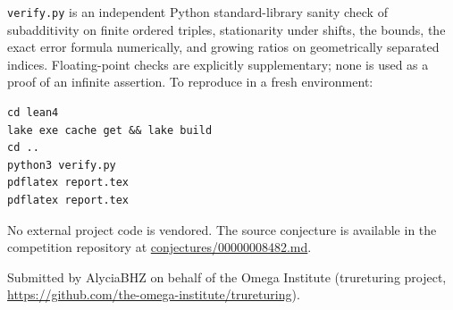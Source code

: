 \documentclass[11pt]{article}
\begin{document}
\texttt{verify.py} is an independent Python standard-library sanity check
of subadditivity on finite ordered triples, stationarity under shifts,
the bounds, the exact error formula numerically, and growing ratios on
geometrically separated indices. Floating-point checks are explicitly
supplementary; none is used as a proof of an infinite assertion. To
reproduce in a fresh environment:
\begin{lstlisting}
cd lean4
lake exe cache get && lake build
cd ..
python3 verify.py
pdflatex report.tex
pdflatex report.tex
\end{lstlisting}
No external project code is vendored. The source conjecture is available
in the competition repository at
\href{https://github.com/The-Last-Math-Competition/The-Last-Math-Competition/blob/main/conjectures/00000008482.md}{conjectures/00000008482.md}.

\medskip\noindent
Submitted by AlyciaBHZ on behalf of the Omega Institute (trureturing project,
\url{https://github.com/the-omega-institute/trureturing}).
\end{document}
